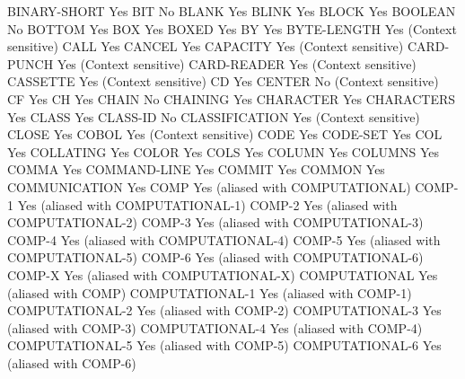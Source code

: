 BINARY-SHORT                    Yes
BIT                             No
BLANK                           Yes
BLINK                           Yes
BLOCK                           Yes
BOOLEAN                         No
BOTTOM                          Yes
BOX                             Yes
BOXED                           Yes
BY                              Yes
BYTE-LENGTH                     Yes (Context sensitive)
CALL                            Yes
CANCEL                          Yes
CAPACITY                        Yes (Context sensitive)
CARD-PUNCH                      Yes (Context sensitive)
CARD-READER                     Yes (Context sensitive)
CASSETTE                        Yes (Context sensitive)
CD                              Yes
CENTER                          No (Context sensitive)
CF                              Yes
CH                              Yes
CHAIN                           No
CHAINING                        Yes
CHARACTER                       Yes
CHARACTERS                      Yes
CLASS                           Yes
CLASS-ID                        No
CLASSIFICATION                  Yes (Context sensitive)
CLOSE                           Yes
COBOL                           Yes (Context sensitive)
CODE                            Yes
CODE-SET                        Yes
COL                             Yes
COLLATING                       Yes
COLOR                           Yes
COLS                            Yes
COLUMN                          Yes
COLUMNS                         Yes
COMMA                           Yes
COMMAND-LINE                    Yes
COMMIT                          Yes
COMMON                          Yes
COMMUNICATION                   Yes
COMP                            Yes (aliased with COMPUTATIONAL)
COMP-1                          Yes (aliased with COMPUTATIONAL-1)
COMP-2                          Yes (aliased with COMPUTATIONAL-2)
COMP-3                          Yes (aliased with COMPUTATIONAL-3)
COMP-4                          Yes (aliased with COMPUTATIONAL-4)
COMP-5                          Yes (aliased with COMPUTATIONAL-5)
COMP-6                          Yes (aliased with COMPUTATIONAL-6)
COMP-X                          Yes (aliased with COMPUTATIONAL-X)
COMPUTATIONAL                   Yes (aliased with COMP)
COMPUTATIONAL-1                 Yes (aliased with COMP-1)
COMPUTATIONAL-2                 Yes (aliased with COMP-2)
COMPUTATIONAL-3                 Yes (aliased with COMP-3)
COMPUTATIONAL-4                 Yes (aliased with COMP-4)
COMPUTATIONAL-5                 Yes (aliased with COMP-5)
COMPUTATIONAL-6                 Yes (aliased with COMP-6)

